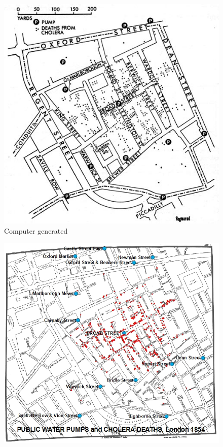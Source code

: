 \documentclass[12pt]{article}
\begin{document}
\begin{figure}
\centering
\includegraphics[scale=10.0]{snowmap1_regmarad}
\caption{Computer generated \cite{ralph}}
\label{fig:reg}
\end{figure}

\begin{figure}
\centering
\includegraphics[scale=1.0]{gis}
\caption{\cite{udel2}}
\label{fig:gis}
\end{figure}
\end{document}
